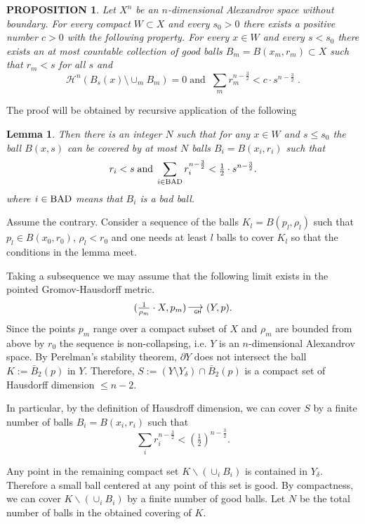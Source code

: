 \documentclass[12pt,leqno,intlimits]{amsart}
\numberwithin{equation}{section}
\newtheorem{lem}[thm]{Lemma}
\newtheorem{prop}[thm]{PROPOSITION}
\theoremstyle{definition}
\theoremstyle{remark}
\def\BAD{\mathop{\rm BAD}\nolimits}%
\newcommand*{\GHto}{\mathbin{\begin{picture}(16,3.5)
\put(-1,1){$\longrightarrow$}
\put(13,-3){\llap{\text{\sf\tiny GH}}}
\end{picture}}}
\def\parit#1{\medskip\noindent{\it #1}}
\begin{document}
\begin{prop}\label{prop:covering}
Let $X^n$ be an $n$-dimensional Alexandrov space without boundary.  For every compact $W\subset X$ and every $s_0>0$   there exists
a positive number $c>0$ with the following property. For every $x\in W$ and every $s<s_0$
 there exists an at most countable collection of good balls $B_m=B(x_m,r_m) \subset X$
such that $r_m<s$ for all $s$ and
$$ \mathcal H^n (B_s (x) \setminus \cup _m B_m)=0  \;   \text{and}  \; \; \sum_m r_m^{n-\frac32}< c \cdot s^{n-\frac 3 2}\;.$$
\end{prop}

The proof will be  obtained by recursive application of the following

\begin{lem}\label{lem:covering}
Then there is an integer $N$ such that for any $x\in W$ and $s \leq s_0$
the ball $B(x,s)$ can be covered by at most $N$ balls
 $B_i=B(x_i,r_i)$ such that
$$r_i< s \; \text{and} \;  \sum_{i\in \BAD}r_i^{n-\frac32}< \tfrac12\cdot s^{n-\frac32}.$$
where $i\in \BAD$ means that $B_i$ is a bad ball.
\end{lem}

\parit{Proof.}
Assume the contrary. Consider  a sequence of the balls
$K_l=B(p_l,\rho_l)$
such that $p_l\in B(x_0,r_0)$,
$\rho_l<r_0$ and
one needs at least $l$ balls to cover $K_l$ so that the conditions in the lemma meet.

Taking a subsequence we may assume that the following limit exists in the pointed Gromov-Hausdorff metric.
$$(\tfrac1{\rho_m}\cdot X,p_m)\GHto (Y,p).$$
Since the points $p_m$ range over a compact subset of $X$ and $\rho _m$ are bounded from above by $r_0$ the
sequence is non-collapsing, i.e. $Y$ is an $n$-dimensional Alexandrov space.
By Perelman's stability theorem, $\partial Y$  does not intersect the ball $K:= \bar B_2 (p)$ in $Y$.
Therefore,  $S:= (Y\setminus Y_{\delta} ) \cap \bar B_2 (p)$ is a compact set of   Hausdorff dimension $\le n-2$.

In particular, by the definition of Hausdroff dimension, we can cover $S$ by a finite number of balls
$B_i=B(x_i,r_i)$ such that
$$\sum_ir_i^{n-\frac32} < (\tfrac12)^{n-\frac32}.$$


Any point in the remaining compact set $K\backslash (\cup_i B_i)$
is contained  in $Y_{\delta}$. Therefore a small ball centered at any point of this set is good.
By compactness, we can cover $K\backslash (\cup_i B_i)$ by a finite number of good balls.
Let $N$ be the total number of balls in the obtained covering of $K$.
\end{document}
